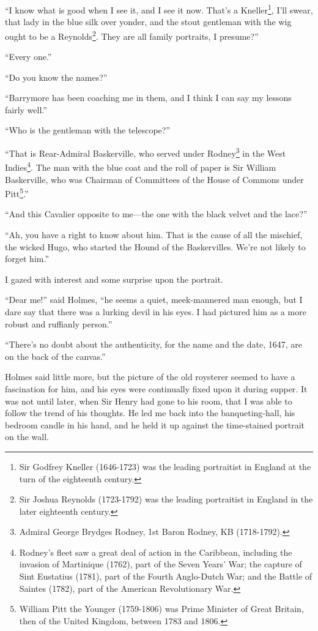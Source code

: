 \documentclass[paper=5.5in:8.5in,BCOR=7mm,twoside,DIV=calc,12pt,usegeometry,openany,chapterprefix,endperiod]{scrbook} %
\begin{document}
\enquote{I know what is good when I see it, and I see it now. That's a Kneller\footnote{Sir Godfrey Kneller (1646-1723) was the leading portraitist in England at the turn of the eighteenth century.}, I'll swear, that lady in the blue silk over yonder, and the stout gentleman with the wig ought to be a Reynolds\footnote{Sir Joshua Reynolds (1723-1792) was the leading portraitist in England in the later eighteenth century.}. They are all family portraits, I presume?}

\enquote{Every one.}

\enquote{Do you know the names?}

\enquote{Barrymore has been coaching me in them, and I think I can say my lessons fairly well.}

\enquote{Who is the gentleman with the telescope?}

\enquote{That is Rear-Admiral Baskerville, who served under Rodney\footnote{Admiral George Brydges Rodney, 1st Baron Rodney, KB (1718-1792).} in the West Indies\footnote{Rodney's fleet saw a great deal of action in the Caribbean, including the invasion of Martinique (1762), part of the Seven Years' War; the capture of Sint Eustatius (1781), part of the Fourth Anglo-Dutch War; and the Battle of Saintes (1782), part of the American Revolutionary War.}. The man with the blue coat and the roll of paper is Sir William Baskerville, who was Chairman of Committees of the House of Commons under Pitt\footnote{William Pitt the Younger (1759-1806) was Prime Minister of Great Britain, then of the United Kingdom, between 1783 and 1806.}.}

\enquote{And this Cavalier opposite to me\nobreakdash---the one with the black velvet and the lace?}

\enquote{Ah, you have a right to know about him. That is the cause of all the mischief, the wicked Hugo, who started the Hound of the Baskervilles. We're not likely to forget him.}

I gazed with interest and some surprise upon the portrait.

\enquote{Dear me!} said Holmes, \enquote{he seems a quiet, meek-mannered man enough, but I dare say that there was a lurking devil in his eyes. I had pictured him as a more robust and ruffianly person.}

\enquote{There's no doubt about the authenticity, for the name and the date, 1647, are on the back of the canvas.}

Holmes said little more, but the picture of the old roysterer seemed to have a fascination for him, and his eyes were continually fixed upon it during supper. It was not until later, when Sir Henry had gone to his room, that I was able to follow the trend of his thoughts. He led me back into the banqueting-hall, his bedroom candle in his hand, and he held it up against the time-stained portrait on the wall.
\end{document}
